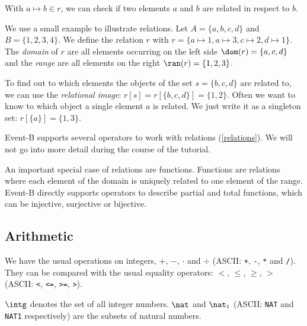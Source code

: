 With $a\mapsto b\in r$, we can check if two elements $a$ and $b$ are related in respect to $b$.

We use a small example to illustrate relations. Let $A = \{a,b,c,d\}$ and $B=\{1,2,3,4\}$.
We define the relation $r$ with $r = \{a\mapsto 1, a\mapsto 3, c\mapsto 2, d\mapsto 1\}$.
The \emph{domain} of $r$ are all elements occurring on the left side $\dom(r) = \{a,c,d\}$ and the
\emph{range} are all elements on the right $\ran(r)=\{1,2,3\}$.

To find out to which elements the objects of the set $s=\{b,c,d\}$ are related to, we can use the \emph{relational image}:
$r[s] = r[\{b,c,d\}] = \{1,2\}$.
Often we want to know to which object a single element $a$ is related. We just write it as a singleton
set: $r[\{a\}] = \{1,3\}$.

Event-B supports several operators to work with relations (\ref{relations}).
We will not go into more detail during the course of the tutorial.

An important special case of relations are functions. Functions are relations where each element of the
domain is uniquely related to one element of the range. Event-B directly supports operators to describe
partial and total functions, which can be injective, surjective or bijective.

\subsection{Arithmetic}
\label{tut_arithmetic}
We have the usual operations on integers, $+$, $-$, $\cdot$ and $\div$ (ASCII: \texttt{+}, \texttt{-},
\texttt{*} and \texttt{/}). They can be compared with the usual equality operators: $<$, $\leq$, $\geq$, $>$ (ASCII: \texttt{<}, \texttt{<=}, \texttt{>=}, \texttt{>}).

$\intg$  denotes the set of all integer numbers. $\nat$ and $\nat_1$ (ASCII: \texttt{NAT} and 
\texttt{NAT1} respectively) are the subsets of natural numbers.


